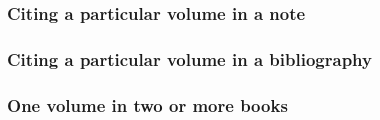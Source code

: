 \documentclass[11pt,letterpaper,oneside]{article}
\begin{document}
\begin{citebib}
\item \cite{aristotle1983}
\item \cite{byrne1981}
\item \cite{james1962}
\end{citebib}

\subsubsection{Citing a particular volume in a note}
\label{14.118}

\begin{citebib}
\item \cite[243]{byrne1981.4}
\item \cite*[32--33]{james1963.5}
\item \cite[245]{byrne1981.4}
\item \cite*[34]{james1963.5}
\end{citebib}

\subsubsection{Citing a particular volume in a bibliography}

\begin{citebib}
\item \cite{armstrong1992}
\end{citebib}



\setcounter{subsubsection}{120}
\subsubsection{One volume in two or more books}
\end{document}
